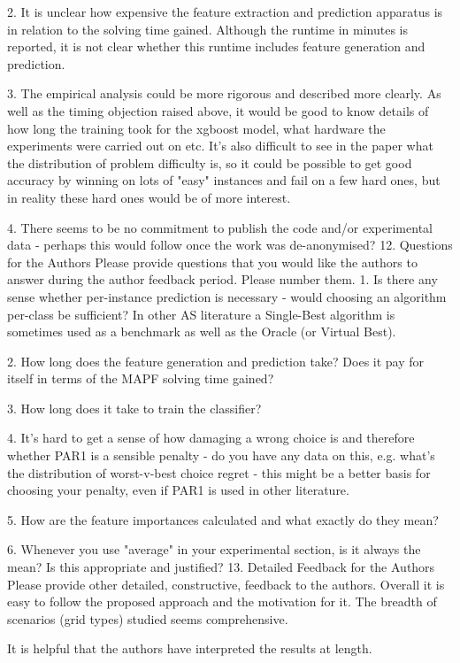 2. It is unclear how expensive the feature extraction and prediction apparatus is in relation to the solving time gained. Although the runtime in minutes is reported, it is not clear whether this runtime includes feature generation and prediction.

3. The empirical analysis could be more rigorous and described more clearly. As well as the timing objection raised above, it would be good to know details of how long the training took for the xgboost model, what hardware the experiments were carried out on etc. It's also difficult to see in the paper what the distribution of problem difficulty is, so it could be possible to get good accuracy by winning on lots of "easy" instances and fail on a few hard ones, but in reality these hard ones would be of more interest.

4. There seems to be no commitment to publish the code and/or experimental data - perhaps this would follow once the work was de-anonymised?
12. {Questions for the Authors} Please provide questions that you would like the authors to answer during the author feedback period. Please number them.
1. Is there any sense whether per-instance prediction is necessary - would choosing an algorithm per-class be sufficient? In other AS literature a Single-Best algorithm is sometimes used as a benchmark as well as the Oracle (or Virtual Best).

2. How long does the feature generation and prediction take? Does it pay for itself in terms of the MAPF solving time gained?

3. How long does it take to train the classifier?

4. It's hard to get a sense of how damaging a wrong choice is and therefore whether PAR1 is a sensible penalty - do you have any data on this, e.g. what's the distribution of worst-v-best choice regret - this might be a better basis for choosing your penalty, even if PAR1 is used in other literature.

5. How are the feature importances calculated and what exactly do they mean?

6. Whenever you use "average" in your experimental section, is it always the mean? Is this appropriate and justified?
13. {Detailed Feedback for the Authors} Please provide other detailed, constructive, feedback to the authors.
Overall it is easy to follow the proposed approach and the motivation for it. The breadth of scenarios (grid types) studied seems comprehensive.

It is helpful that the authors have interpreted the results at length.

